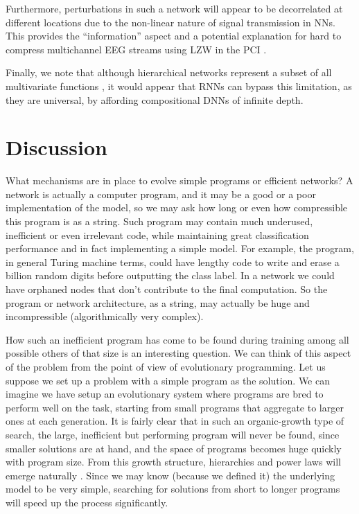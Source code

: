 \documentclass[11pt]{amsart}
\begin{document}
Furthermore, perturbations in such a network will appear to be decorrelated at different locations due to the non-linear nature of signal transmission in NNs. This provides the ``information'' aspect and a potential explanation for hard to compress multichannel EEG streams using LZW in the PCI \cite{Casali:2013aa}.

Finally, we note that although hierarchical networks represent a subset of  all multivariate functions \cite{Mhaskar:2016aa}, it would appear that RNNs can bypass this limitation, as they are universal, by affording compositional DNNs of infinite depth.




\section{Discussion}
What mechanisms are in place to evolve simple programs or efficient networks?   A network is actually a computer program, and it may be a good or a  poor implementation of the model, so we may ask how long or even how compressible this program is as a string. Such program may contain much underused,  inefficient or even irrelevant code, while maintaining great classification performance and in fact implementing a simple model. For example, the program, in general Turing machine terms,  could have lengthy code to write and erase a billion random digits before outputting the class label. In a network we could have orphaned nodes that don't contribute to the final computation. So the program or network architecture, as a string, may actually be huge and  incompressible (algorithmically very complex).  

How such an inefficient program has come to be found during training among all possible others of that size is an interesting question.  We can think of this aspect of the problem from the point of view of evolutionary programming. Let us suppose we set up a problem with a simple program as the solution.  We can imagine we have setup an evolutionary system where programs are bred to perform well on the task, starting from small programs that aggregate to larger ones at each generation. It is fairly clear that in such an organic-growth type of  search, the large, inefficient but performing program will never be found, since smaller solutions are  at hand, and the space of programs becomes huge quickly with program size. From this growth structure, hierarchies and power laws will emerge naturally \cite{Ravasz:2003aa}. Since we  may know (because we defined it) the underlying model to be very simple, searching for solutions from short to longer  programs will speed up the process significantly.
\end{document}
